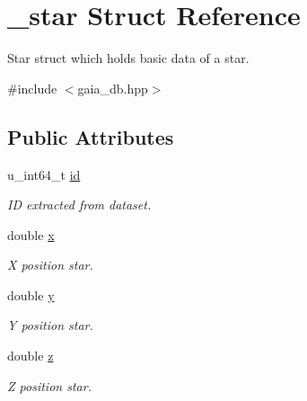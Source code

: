 \hypertarget{struct__star}{}\section{\+\_\+star Struct Reference}
\label{struct__star}


Star struct which holds basic data of a star.  




{\ttfamily \#include $<$gaia\+\_\+db.\+hpp$>$}

\subsection*{Public Attributes}
\begin{DoxyCompactItemize}
\item 
\mbox{\label{struct__star_a6b571bc027dfc8c30bad11bfce07a23c}} 
u\+\_\+int64\+\_\+t \mbox{\hyperlink{struct__star_a6b571bc027dfc8c30bad11bfce07a23c}{id}}
\begin{DoxyCompactList}\small\item\em ID extracted from dataset. \end{DoxyCompactList}\item 
\mbox{\label{struct__star_aa0894b982143e830a7c2b979de63fe69}} 
double \mbox{\hyperlink{struct__star_aa0894b982143e830a7c2b979de63fe69}{x}}
\begin{DoxyCompactList}\small\item\em X position star. \end{DoxyCompactList}\item 
\mbox{\label{struct__star_a00d87762a797270a59f86b3e5bd82c0e}} 
double \mbox{\hyperlink{struct__star_a00d87762a797270a59f86b3e5bd82c0e}{y}}
\begin{DoxyCompactList}\small\item\em Y position star. \end{DoxyCompactList}\item 
\mbox{\label{struct__star_a07a680ef4c9c4e39d04d7e96722d5eca}} 
double \mbox{\hyperlink{struct__star_a07a680ef4c9c4e39d04d7e96722d5eca}{z}}
\begin{DoxyCompactList}\small\item\em Z position star. \end{DoxyCompactList}\item 

\end{DoxyCompactItemize}

